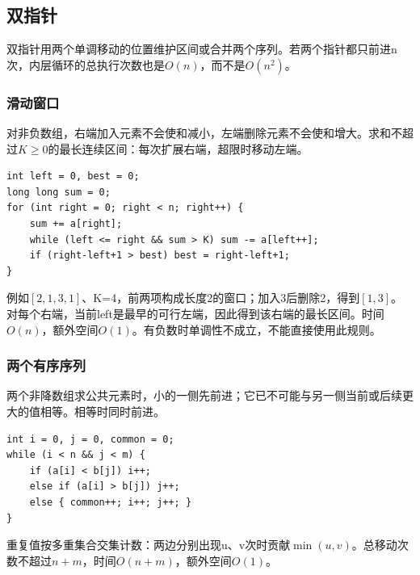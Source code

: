 \subsection{双指针}
双指针用两个单调移动的位置维护区间或合并两个序列。若两个指针都只前进n次，内层循环的总执行次数也是$O(n)$，而不是$O(n^2)$。
\subsubsection{滑动窗口}
对非负数组，右端加入元素不会使和减小，左端删除元素不会使和增大。求和不超过$K\ge0$的最长连续区间：每次扩展右端，超限时移动左端。
\begin{lstlisting}
int left = 0, best = 0;
long long sum = 0;
for (int right = 0; right < n; right++) {
    sum += a[right];
    while (left <= right && sum > K) sum -= a[left++];
    if (right-left+1 > best) best = right-left+1;
}
\end{lstlisting}
例如$[2,1,3,1]$、K=4，前两项构成长度2的窗口；加入3后删除2，得到$[1,3]$。对每个右端，当前left是最早的可行左端，因此得到该右端的最长区间。时间$O(n)$，额外空间$O(1)$。有负数时单调性不成立，不能直接使用此规则。
\subsubsection{两个有序序列}
两个非降数组求公共元素时，小的一侧先前进；它已不可能与另一侧当前或后续更大的值相等。相等时同时前进。
\begin{lstlisting}
int i = 0, j = 0, common = 0;
while (i < n && j < m) {
    if (a[i] < b[j]) i++;
    else if (a[i] > b[j]) j++;
    else { common++; i++; j++; }
}
\end{lstlisting}
重复值按多重集合交集计数：两边分别出现u、v次时贡献$\min(u,v)$。总移动次数不超过$n+m$，时间$O(n+m)$，额外空间$O(1)$。
